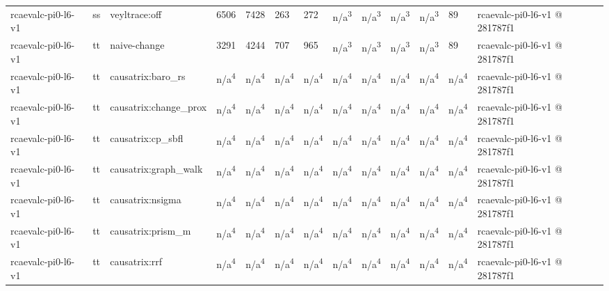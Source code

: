 \begin{table}[t]
\begin{tabular}{lllllllllllll}
rcaevalc-pi0-l6-v1 & ss & veyltrace:off & 6506 & 7428 & 263 & 272 & n/a\textsuperscript{3} & n/a\textsuperscript{3} & n/a\textsuperscript{3} & n/a\textsuperscript{3} & 89 & rcaevalc-pi0-l6-v1 @ 281787f1 \\
rcaevalc-pi0-l6-v1 & tt & naive-change & 3291 & 4244 & 707 & 965 & n/a\textsuperscript{3} & n/a\textsuperscript{3} & n/a\textsuperscript{3} & n/a\textsuperscript{3} & 89 & rcaevalc-pi0-l6-v1 @ 281787f1 \\
rcaevalc-pi0-l6-v1 & tt & causatrix:baro\_rs & n/a\textsuperscript{4} & n/a\textsuperscript{4} & n/a\textsuperscript{4} & n/a\textsuperscript{4} & n/a\textsuperscript{4} & n/a\textsuperscript{4} & n/a\textsuperscript{4} & n/a\textsuperscript{4} & n/a\textsuperscript{4} & rcaevalc-pi0-l6-v1 @ 281787f1 \\
rcaevalc-pi0-l6-v1 & tt & causatrix:change\_prox & n/a\textsuperscript{4} & n/a\textsuperscript{4} & n/a\textsuperscript{4} & n/a\textsuperscript{4} & n/a\textsuperscript{4} & n/a\textsuperscript{4} & n/a\textsuperscript{4} & n/a\textsuperscript{4} & n/a\textsuperscript{4} & rcaevalc-pi0-l6-v1 @ 281787f1 \\
rcaevalc-pi0-l6-v1 & tt & causatrix:cp\_sbfl & n/a\textsuperscript{4} & n/a\textsuperscript{4} & n/a\textsuperscript{4} & n/a\textsuperscript{4} & n/a\textsuperscript{4} & n/a\textsuperscript{4} & n/a\textsuperscript{4} & n/a\textsuperscript{4} & n/a\textsuperscript{4} & rcaevalc-pi0-l6-v1 @ 281787f1 \\
rcaevalc-pi0-l6-v1 & tt & causatrix:graph\_walk & n/a\textsuperscript{4} & n/a\textsuperscript{4} & n/a\textsuperscript{4} & n/a\textsuperscript{4} & n/a\textsuperscript{4} & n/a\textsuperscript{4} & n/a\textsuperscript{4} & n/a\textsuperscript{4} & n/a\textsuperscript{4} & rcaevalc-pi0-l6-v1 @ 281787f1 \\
rcaevalc-pi0-l6-v1 & tt & causatrix:nsigma & n/a\textsuperscript{4} & n/a\textsuperscript{4} & n/a\textsuperscript{4} & n/a\textsuperscript{4} & n/a\textsuperscript{4} & n/a\textsuperscript{4} & n/a\textsuperscript{4} & n/a\textsuperscript{4} & n/a\textsuperscript{4} & rcaevalc-pi0-l6-v1 @ 281787f1 \\
rcaevalc-pi0-l6-v1 & tt & causatrix:prism\_m & n/a\textsuperscript{4} & n/a\textsuperscript{4} & n/a\textsuperscript{4} & n/a\textsuperscript{4} & n/a\textsuperscript{4} & n/a\textsuperscript{4} & n/a\textsuperscript{4} & n/a\textsuperscript{4} & n/a\textsuperscript{4} & rcaevalc-pi0-l6-v1 @ 281787f1 \\
rcaevalc-pi0-l6-v1 & tt & causatrix:rrf & n/a\textsuperscript{4} & n/a\textsuperscript{4} & n/a\textsuperscript{4} & n/a\textsuperscript{4} & n/a\textsuperscript{4} & n/a\textsuperscript{4} & n/a\textsuperscript{4} & n/a\textsuperscript{4} & n/a\textsuperscript{4} & rcaevalc-pi0-l6-v1 @ 281787f1 \\

\end{tabular}
\end{table}
